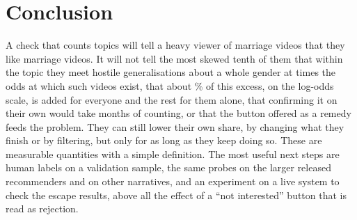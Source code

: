 \section{Conclusion}

A check that counts topics will tell a heavy viewer of marriage videos that they like marriage videos. It will not tell the most skewed tenth of them that within the topic they meet hostile generalisations about a whole gender at \nTopDecileTotalOdds{} times the odds at which such videos exist, that about \nTopDecileLayerShare\% of this excess, on the log-odds scale, is added for everyone and the rest for them alone, that confirming it on their own would take months of counting, or that the button offered as a remedy feeds the problem. They can still lower their own share, by changing what they finish or by filtering, but only for as long as they keep doing so. These are measurable quantities with a simple definition. The most useful next steps are human labels on a validation sample, the same probes on the larger released recommenders and on other narratives, and an experiment on a live system to check the escape results, above all the effect of a ``not interested'' button that is read as rejection.
